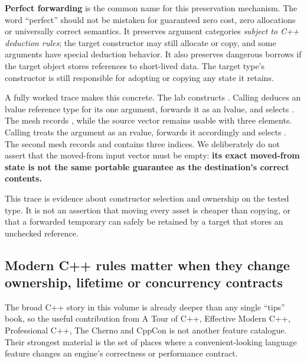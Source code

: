 \textbf{Perfect forwarding} is the common name for this preservation mechanism. The word ``perfect'' should not be mistaken for guaranteed zero cost, zero allocations or universally correct semantics. It preserves argument categories \emph{subject to C++ deduction rules}; the target constructor may still allocate or copy, and some arguments have special deduction behavior. It also preserves dangerous borrows if the target object stores references to short-lived data. The target type's constructor is still responsible for adopting or copying any state it retains.

A fully worked trace makes this concrete. The lab constructs . Calling  deduces an lvalue reference type for its one argument, forwards it as an lvalue, and selects . The mesh records , while the source vector remains usable with three elements. Calling  treats the argument as an rvalue, forwards it accordingly and selects . The second mesh records  and contains three indices. We deliberately do not assert that the moved-from input vector must be empty: \textbf{its exact moved-from state is not the same portable guarantee as the destination's correct contents.}

This trace is evidence about constructor selection and ownership on the tested type. It is not an assertion that moving every asset is cheaper than copying, or that a forwarded temporary can safely be retained by a target that stores an unchecked reference.

\subsection{Modern C++ rules matter when they change ownership, lifetime or concurrency contracts}\label{01-foundations-i-ch005-modern-c-rules-matter-when-they-change-ownership-lifetime-or-concurrency-contracts}

\hypertarget{01-foundations-i-ch005-modern-c-rules-matter-when-they-change-ownership-lifetime-or-concurrency-contracts}{}

The broad C++ story in this volume is already deeper than any single ``tips'' book, so the useful contribution from A Tour of C++, Effective Modern C++, Professional C++, The Cherno and CppCon is not another feature catalogue. Their strongest material is the set of places where a convenient-looking language feature changes an engine's correctness or performance contract.


